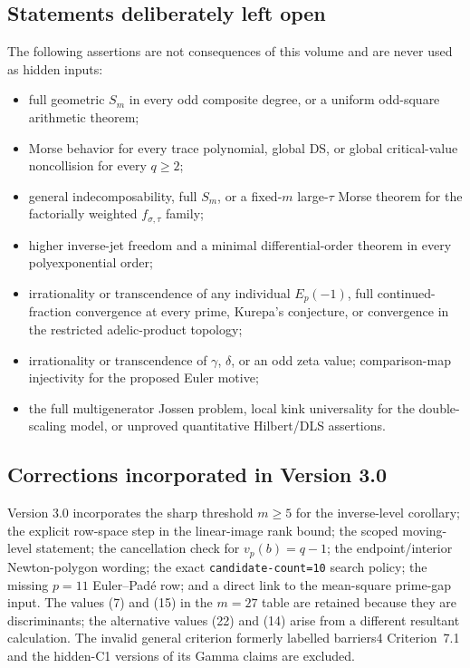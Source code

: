 \documentclass[11pt]{article}
\theoremstyle{keio}
\theoremstyle{definition}
\theoremstyle{remark}
\begin{document}
\subsection{Statements deliberately left open}

The following assertions are not consequences of this volume and are never
used as hidden inputs:

\begin{itemize}
\item full geometric \(S_m\) in every odd composite degree, or a uniform
odd-square arithmetic theorem;
\item Morse behavior for every trace polynomial, global DS, or global
critical-value noncollision for every \(q\ge2\);
\item general indecomposability, full \(S_m\), or a fixed-\(m\) large-\(\tau\)
Morse theorem for the factorially weighted \(f_{\sigma,\tau}\) family;
\item higher inverse-jet freedom and a minimal differential-order theorem in
every polyexponential order;
\item irrationality or transcendence of any individual \(E_p(-1)\), full
continued-fraction convergence at every prime, Kurepa's conjecture, or
convergence in the restricted adelic-product topology;
\item irrationality or transcendence of \(\gamma\), \(\delta\), or an odd
zeta value; comparison-map injectivity for the proposed Euler motive;
\item the full multigenerator Jossen problem, local kink universality for the
double-scaling model, or unproved quantitative Hilbert/DLS assertions.
\end{itemize}

\subsection{Corrections incorporated in Version 3.0}

Version 3.0 incorporates the sharp threshold \(m\ge5\) for the inverse-level
corollary; the explicit row-space step in the linear-image rank bound; the
scoped moving-level statement; the cancellation check for
\(v_p(b)=q-1\); the endpoint/interior Newton-polygon wording; the exact
\texttt{candidate-count=10} search policy; the missing \(p=11\) Euler--Pad\'e
row; and a direct link to the mean-square prime-gap input.  The values (7)
and (15) in the \(m=27\) table are retained because they are discriminants;
the alternative values (22) and (14) arise from a different resultant
calculation.  The invalid general criterion formerly labelled barriers4
Criterion~7.1 and the hidden-C1 versions of its Gamma claims are excluded.
\end{document}
